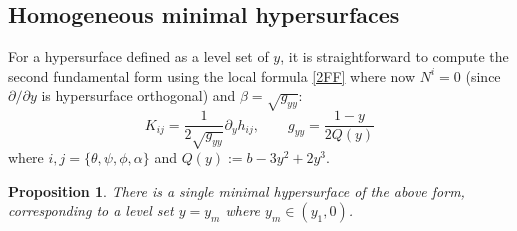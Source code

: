 \documentclass[11pt]{amsart}
\theoremstyle{plain}
\newtheorem{prop}[theorem]{Proposition}
\theoremstyle{definition}
\numberwithin{equation}{section}
\begin{document}
\subsection{Homogeneous minimal hypersurfaces} For a hypersurface defined as a level set of $y$, it is straightforward to compute the second fundamental form using the local formula \eqref{2FF} where now $N^i =0$ (since $\partial/\partial y$ is hypersurface orthogonal) and $\beta = \sqrt{g_{yy}}$:
\begin{equation}
    K_{ij} = \frac{1}{2\sqrt{g_{yy}}} \partial_y h_{ij}, \qquad g_{yy} = \frac{1-y}{2Q(y)}
\end{equation} where $i,j = \{\theta,\psi,\phi,\alpha\}$ and $Q(y):=b - 3y^2 + 2y^3$. 
\begin{prop} There is a single minimal hypersurface of the above form, corresponding to a level set $y = y_m$ where $y_m \in (y_1,0)$. 
\end{prop}
\end{document}
